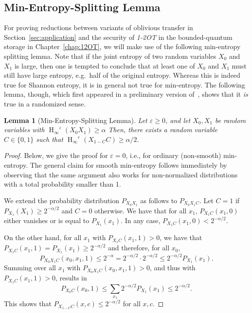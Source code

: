 \documentclass[final,11pt,a4paper]{report}
\newtheorem{lemma}[theorem]{Lemma}
\newcommand*{\onetwo}[1][2]{\mbox{\textsl{1\hspace{-0.1ex}-#1}}}
\newcommand*{\OT}[1][2]{\index{oblivious transfer!one-out-of-two}\textsl{\onetwo[#1]\:OT}\xspace}               %
\newcommand*{\set}[1]{\{#1\}}          %
\renewcommand*{\H}{\operatorname{H}}   %
\newcommand*{\hmin}{\ensuremath{\H_{\infty}}}
\begin{document}
\subsection{Min-Entropy-Splitting Lemma} 
For proving reductions between variants of oblivious transfer in
Section~\ref{sec:application} and the security of \OT in the
bounded-quantum storage in Chapter~\ref{chap:12OT}, we will make use
of the following min-entropy splitting lemma. Note that if the joint
entropy of two random variables $X_0$ and $X_1$ is large, then one is
tempted to conclude that at least one of $X_0$ and $X_1$ must still
have large entropy, e.g.\ half of the original entropy. Whereas this
is indeed true for Shannon entropy, it is in general not true for
min-entropy. The following lemma, though, which first appeared in a
preliminary version of~\cite{Wullschleger07}, shows that it {\em is}
true in a randomized sense.
\begin{lemma}[Min-Entropy-Splitting Lemma]\label{lemma:ESL}
  Let $\varepsilon \geq 0$, and let $X_0,X_1$ be random variables with
  \mbox{$\hmin^{\varepsilon}(X_0 X_1) \geq \alpha$} %
Then, there exists a
  random variable $C \in \set{0,1}$ such that
  \mbox{$\hmin^{\varepsilon}(X_{1-C} C) \geq \alpha/2$}.
\end{lemma}
\begin{proof}
Below, we give the proof for $\varepsilon = 0$, i.e., for ordinary
(non-smooth) min-entropy. The general claim for smooth min-entropy
follows immediately by observing that the same argument also works for
non-normalized distributions with a total probability smaller than 1.

We extend the probability distribution $P_{X_0 X_1}$ as follows to
$P_{X_0 X_1 C}$. Let $C=1$ if $P_{X_1}(X_1) \geq 2^{-\alpha/2}$ and
$C=0$ otherwise.  We have that for all $x_1$, $P_{X_1 C}(x_1,0)$
either vanishes or is equal to $P_{X_1}(x_1)$. In any case, $P_{X_1
  C}(x_1,0) < 2^{-\alpha/2}$.
  
  On the other hand, for all $x_1$ with $P_{X_1 C}(x_1,1)>0$, we have
  that $P_{X_1 C}(x_1,1)=P_{X_1}(x_1) \geq 2^{-\alpha/2}$ and
  therefore, for all $x_0$,
\begin{equation*} %
 P_{X_0 X_1 C}(x_0,x_1,1) \leq 2^{-\alpha} =2^{-\alpha/2} \cdot
 2^{-\alpha/2} \leq 2^{-\alpha/2} P_{X_1}(x_1).
\end{equation*}
Summing over all $x_1$ with $P_{X_0 X_1 C}(x_0,x_1,1) > 0$, and thus with $P_{X_1 C}(x_1,1) > 0$, results in
$$
P_{X_0 C}(x_0,1) \leq \sum_{x_1} 2^{-\alpha/2} P_{X_1}(x_1)
\leq 2^{-\alpha/2}.
$$
This shows that $P_{X_{1-C} C}(x,c) \leq 2^{-\alpha/2}$ for all $x,c$.
\end{proof}
\end{document}
